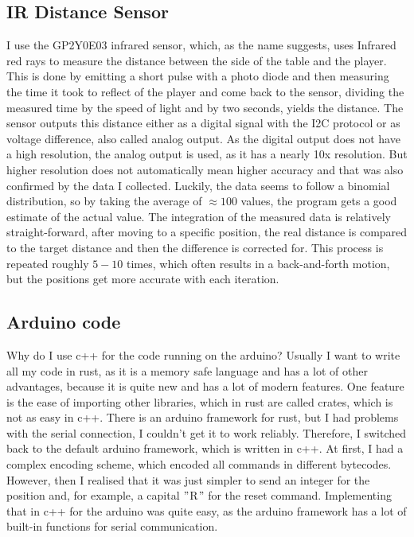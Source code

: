 \subsection{IR Distance Sensor}\label{subsec:ir-distance-sensor}
I use the GP2Y0E03\autocite{ir-sensor} infrared sensor, which, as the name suggests, uses Infrared red rays to measure the distance between the side of the table and the player.
This is done by emitting a short pulse with a photo diode and then measuring the time it took to reflect of the player and come back to the sensor, dividing the measured time by the speed of light and by two seconds, yields the distance.
The sensor outputs this distance either as a digital signal with the I2C protocol or as voltage difference, also called analog output.
As the digital output does not have a high resolution, the analog output is used, as it has a nearly 10x resolution.
But higher resolution does not automatically mean higher accuracy and that was also confirmed by the data I collected.
Luckily, the data seems to follow a binomial distribution, so by taking the average of $\approx100$ values, the program gets a good estimate of the actual value.
The integration of the measured data is relatively straight-forward, after moving to a specific position, the real distance is compared to the target distance and then the difference is corrected for.
This process is repeated roughly $5-10$ times, which often results in a back-and-forth motion, but the positions get more accurate with each iteration.

\subsection{Arduino code}\label{subsec:arduino-code}
Why do I use c++ for the code running on the arduino?
Usually I want to write all my code in rust, as it is a memory safe language and has a lot of other advantages, because it is quite new and has a lot of modern features.
One feature is the ease of importing other libraries, which in rust are called crates, which is not as easy in c++.
There is an arduino framework for rust, but I had problems with the serial connection, I couldn't get it to work reliably.
Therefore, I switched back to the default arduino framework, which is written in c++.
At first, I had a complex encoding scheme, which encoded all commands in different bytecodes.
However, then I realised that it was just simpler to send an integer for the position and, for example, a capital \("\)R\("\) for the reset command.
Implementing that in c++ for the arduino was quite easy, as the arduino framework has a lot of built-in functions for serial communication.